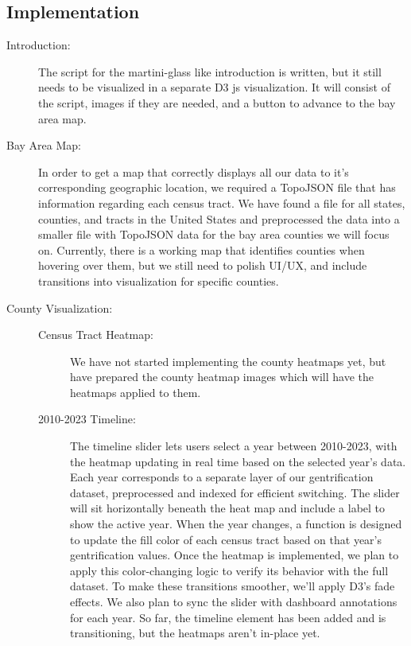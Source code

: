 \documentclass{article}
\begin{document}


\subsection{Implementation}

\begin{description}

    \item[Introduction:] The script for the martini-glass like introduction is written, but it still needs to be visualized in a separate D3 js visualization. It will consist of the script, images if they are needed, and a button to advance to the bay area map.
    
    \item[Bay Area Map:]  In order to get a map that correctly displays all our data to it's corresponding geographic location, we required a TopoJSON file that has information regarding each census tract. We have found a file for all states, counties, and tracts in the United States and preprocessed the data into a smaller file with TopoJSON data for the bay area counties we will focus on. Currently, there is a working map that identifies counties when hovering over them, but we still need to polish UI/UX, and include transitions into visualization for specific counties.
        
    \item[County Visualization:] \hfill
    
    \begin{description}
    
        \item[Census Tract Heatmap:] We have not started implementing the county heatmaps yet, but have prepared the county heatmap images which will have the heatmaps applied to them.
        
        \item[2010-2023 Timeline:] The timeline slider lets users select a year between 2010-2023, with the heatmap updating in real time based on the selected year’s data. Each year corresponds to a separate layer of our gentrification dataset, preprocessed and indexed for efficient switching. The slider will sit horizontally beneath the heat map and include a label  to show the active year. When the year changes, a function is designed to update the fill color of each census tract based on that year’s gentrification values. Once the heatmap is implemented, we plan to apply this color-changing logic to verify its behavior with the full dataset. To make these transitions smoother, we’ll apply D3's fade effects. We also plan to sync the slider with dashboard annotations for each year. So far, the timeline element has been added and is transitioning, but the heatmaps aren't in-place yet.
        

\end{description}
\end{description}
\end{document}
